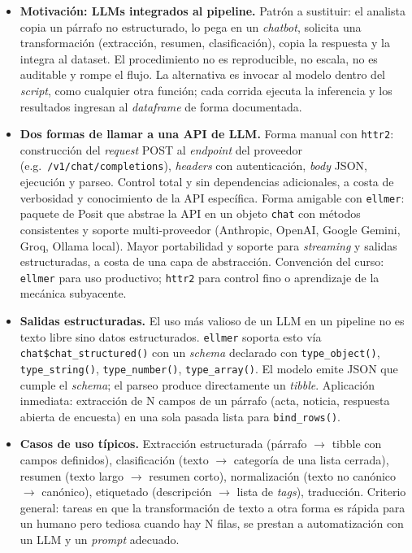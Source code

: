 \documentclass[11pt,letterpaper]{article}
\begin{document}
\begin{itemize}[leftmargin=*, itemsep=2pt]
    \item \textbf{Motivación: LLMs integrados al pipeline.} Patrón a sustituir: el analista copia un párrafo no estructurado, lo pega en un \textit{chatbot}, solicita una transformación (extracción, resumen, clasificación), copia la respuesta y la integra al dataset. El procedimiento no es reproducible, no escala, no es auditable y rompe el flujo. La alternativa es invocar al modelo dentro del \textit{script}, como cualquier otra función; cada corrida ejecuta la inferencia y los resultados ingresan al \textit{dataframe} de forma documentada.
    \item \textbf{Dos formas de llamar a una API de LLM.} Forma manual con \texttt{httr2}: construcción del \textit{request} POST al \textit{endpoint} del proveedor (e.g.\ \texttt{/v1/chat/completions}), \textit{headers} con autenticación, \textit{body} JSON, ejecución y parseo. Control total y sin dependencias adicionales, a costa de verbosidad y conocimiento de la API específica. Forma amigable con \texttt{ellmer}: paquete de Posit que abstrae la API en un objeto \texttt{chat} con métodos consistentes y soporte multi-proveedor (Anthropic, OpenAI, Google Gemini, Groq, Ollama local). Mayor portabilidad y soporte para \textit{streaming} y salidas estructuradas, a costa de una capa de abstracción. Convención del curso: \texttt{ellmer} para uso productivo; \texttt{httr2} para control fino o aprendizaje de la mecánica subyacente.
    \item \textbf{Salidas estructuradas.} El uso más valioso de un LLM en un pipeline no es texto libre sino datos estructurados. \texttt{ellmer} soporta esto vía \texttt{chat\$chat\_structured()} con un \textit{schema} declarado con \texttt{type\_object()}, \texttt{type\_string()}, \texttt{type\_number()}, \texttt{type\_array()}. El modelo emite JSON que cumple el \textit{schema}; el parseo produce directamente un \textit{tibble}. Aplicación inmediata: extracción de N campos de un párrafo (acta, noticia, respuesta abierta de encuesta) en una sola pasada lista para \texttt{bind\_rows()}.
    \item \textbf{Casos de uso típicos.} Extracción estructurada (párrafo $\to$ tibble con campos definidos), clasificación (texto $\to$ categoría de una lista cerrada), resumen (texto largo $\to$ resumen corto), normalización (texto no canónico $\to$ canónico), etiquetado (descripción $\to$ lista de \textit{tags}), traducción. Criterio general: tareas en que la transformación de texto a otra forma es rápida para un humano pero tediosa cuando hay N filas, se prestan a automatización con un LLM y un \textit{prompt} adecuado.

\end{itemize}
\end{document}
